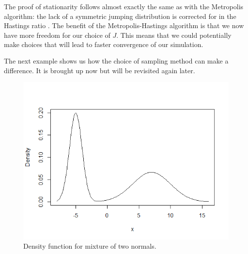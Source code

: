 \documentclass[11pt]{amsart}
\theoremstyle{theorem} %
\theoremstyle{definition}                  %
\theoremstyle{example}                       %
\theoremstyle{remark}                       %
\numberwithin{equation}{section}
\begin{document}
The proof of stationarity follows almost exactly the same as with the Metropolis algorithm: the lack of a symmetric jumping distribution is corrected for in the Hastings ratio \cite[p.~498]{blitzstein}. The benefit of the Metropolis-Hastings algorithm is that we now have more freedom for our choice of $J$. This means that we could potentially make choices that will lead to faster convergence of our simulation.

The next example shows us how the choice of sampling method can make a difference. It is brought up now but will be revisited again later.
\begin{figure}[H]
    \includegraphics[width = .5\textwidth]{mixdensity.png}
    \caption{Density function for mixture of two normals.}
    \label{fig:mix}
\end{figure}
\end{document}
